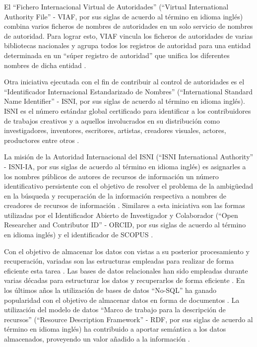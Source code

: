 El ``Fichero Internacional Virtual de Autoridades'' (``Virtual International Authority File'' - VIAF, por sus siglas de acuerdo al término en idioma inglés) combina varios ficheros de nombres de autoridades en un solo servicio de nombres de autoridad. Para lograr esto, VIAF vincula los ficheros de autoridades de varias bibliotecas nacionales y agrupa todos los registros de autoridad para una entidad determinada en un ``súper registro de autoridad'' que unifica los diferentes nombres de dicha entidad \citep{OCLCOnlineComputerLibraryCenterInc.2014}.

Otra iniciativa ejecutada con el fin de contribuir al control de autoridades es el ``Identificador Internacional Estandarizado de Nombres'' (``International Standard Name Identifier'' - ISNI, por sus siglas de acuerdo al término en idioma inglés). ISNI es el número estándar global certificado para identificar a los contribuidores de trabajos creativos y a aquellos involucrados en su distribución como investigadores, inventores, escritores, artistas, creadores visuales, actores, productores entre otros \citep{ISNIInternationalStandardNameIdentifier2017}.

La misión de la Autoridad Internacional del ISNI (``ISNI International Authority'' - ISNI-IA, por sus siglas de acuerdo al término en idioma inglés) es asignarles a los nombres públicos de autores de recursos de información un número identificativo persistente con el objetivo de resolver el problema de la ambigüedad en la búsqueda y recuperación de la información respectiva a nombres de creadores de recursos de información \citep{ISNIInternationalStandardNameIdentifier2017}. Similares a esta iniciativa son las formas utilizadas por el Identificador Abierto de Investigador y Colaborador (``Open Researcher and Contributor ID'' - ORCID, por sus siglas de acuerdo al término en idioma inglés) \citep{ORCID2017} y el identificador de SCOPUS \citep{Elsevier2016}.

Con el objetivo de almacenar los datos con vistas a su posterior procesamiento y recuperación, variadas son las estructuras empleadas para realizar de forma eficiente esta tarea \citep{Gutierrez2011,Vavliakis2013,Lacasta2013}. Las bases de datos relacionales han sido empleadas durante varias décadas para estructurar los datos y recuperarlos de forma eficiente \citep{maier1983theory,Shanmugasundaram1999,Ilyas2004,Spanos2012}. En los últimos años la utilización de bases de datos ``No-SQL'' ha ganado popularidad con el objetivo de almacenar datos en forma de documentos \citep{Pokorny2013,Moniruzzaman2013}. La utilización del modelo de datos ``Marco de trabajo para la descripción de recursos'' (``Resource Description Framework'' - RDF, por sus siglas de acuerdo al término en idioma inglés) ha contribuido a aportar semántica a los datos almacenados, proveyendo un valor añadido a la información \citep{Berners-Lee2001,Konstantinou2014,Sule2016}.

